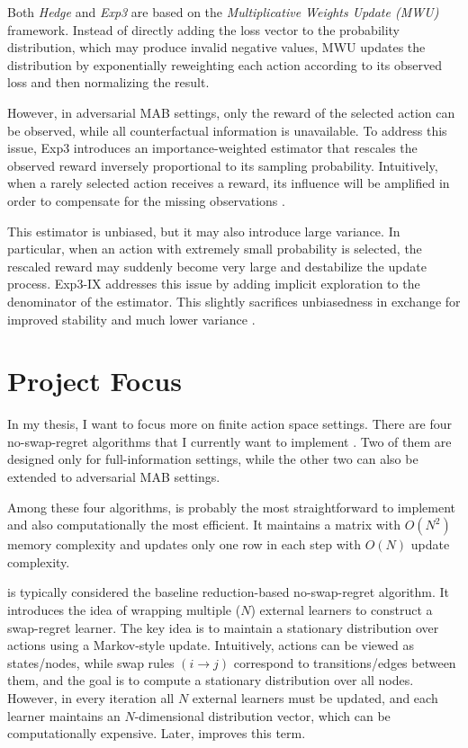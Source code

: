 \documentclass[12pt,a4paper]{article}
\begin{document}
Both \emph{Hedge} and \emph{Exp3} are based on the \emph{Multiplicative Weights Update (MWU)} framework.
Instead of directly adding the loss vector to the probability distribution, which may produce invalid negative values, MWU updates the distribution by exponentially reweighting each action according to its observed loss and then normalizing the result.

However, in adversarial MAB settings, only the reward of the selected action can be observed, while all counterfactual information is unavailable.
To address this issue, Exp3 introduces an importance-weighted estimator that rescales the observed reward inversely proportional to its sampling probability.
Intuitively, when a rarely selected action receives a reward, its influence will be amplified in order to compensate for the missing observations \cite{lattimore2020bandit}.

This estimator is unbiased, but it may also introduce large variance.
In particular, when an action with extremely small probability is selected, the rescaled reward may suddenly become very large and destabilize the update process.
Exp3-IX addresses this issue by adding implicit exploration to the denominator of the estimator.
This slightly sacrifices unbiasedness in exchange for improved stability and much lower variance \cite{lattimore2020bandit}.

\section{Project Focus}

In my thesis, I want to focus more on finite action space settings.
There are four no-swap-regret algorithms that I currently want to implement \cite{blum2005internal, hart2000regret, stoltz2005internal, ito2020swap}.
Two of them \cite{hart2000regret, stoltz2005internal} are designed only for full-information settings, while the other two \cite{blum2005internal, ito2020swap} can also be extended to adversarial MAB settings.

Among these four algorithms, \cite{hart2000regret} is probably the most straightforward to implement and also computationally the most efficient.
It maintains a matrix with $O(N^2)$ memory complexity and updates only one row in each step with $O(N)$ update complexity.

\cite{blum2005internal} is typically considered the baseline reduction-based no-swap-regret algorithm.
It introduces the idea of wrapping multiple ($N$) external learners to construct a swap-regret learner.
The key idea is to maintain a stationary distribution over actions using a Markov-style update.
Intuitively, actions can be viewed as states/nodes, while swap rules $(i \rightarrow j)$ correspond to transitions/edges between them, and the goal is to compute a stationary distribution over all nodes.
However, in every iteration all $N$ external learners must be updated, and each learner maintains an $N$-dimensional distribution vector, which can be computationally expensive.
Later, \cite{ito2020swap} improves this term.
\end{document}
